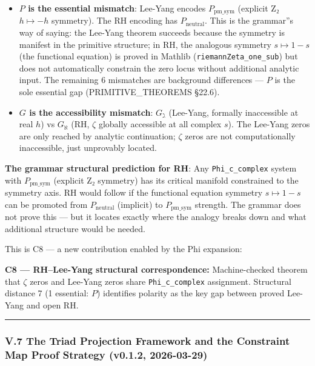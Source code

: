\documentclass[12pt,a4paper]{article}
\newcommand{\pilcrow}{\S}
\begin{document}
\begin{itemize}
    \item \textbf{$P$ is the essential mismatch}: Lee-Yang encodes $P_\text{pm\_sym}$ (explicit Z₂ $h \mapsto -h$ symmetry). The RH encoding has $P_\text{neutral}$. This is the grammar''s way of saying: the Lee-Yang theorem succeeds because the symmetry is manifest in the primitive structure; in RH, the analogous symmetry $s \mapsto 1-s$ (the functional equation) is proved in Mathlib (\texttt{riemannZeta\_one\_sub}) but does not automatically constrain the zero locus without additional analytic input. The remaining 6 mismatches are background differences --- $P$ is the sole essential gap (PRIMITIVE\_THEOREMS \pilcrow{}22.6).
    \item \textbf{$G$ is the accessibility mismatch}: $G_{\gimel}$ (Lee-Yang, formally inaccessible at real $h$) vs $G_{\aleph}$ (RH, $\zeta$ globally accessible at all complex $s$). The Lee-Yang zeros are only reached by analytic continuation; $\zeta$ zeros are not computationally inaccessible, just unprovably located.
\end{itemize}

\textbf{The grammar structural prediction for RH}: Any \texttt{Phi\_c\_complex} system with $P_\text{pm\_sym}$ (explicit Z₂ symmetry) has its critical manifold constrained to the symmetry axis. RH would follow if the functional equation symmetry $s \mapsto 1-s$ can be promoted from $P_\text{neutral}$ (implicit) to $P_\text{pm\_sym}$ strength. The grammar does not prove this --- but it locates exactly where the analogy breaks down and what additional structure would be needed.

This is C8 --- a new contribution enabled by the Phi expansion:

\textbf{C8 --- RH--Lee-Yang structural correspondence:} Machine-checked theorem that $\zeta$ zeros and Lee-Yang zeros share \texttt{Phi\_c\_complex} assignment. Structural distance 7 (1 essential: $P$) identifies polarity as the key gap between proved Lee-Yang and open RH.

\begin{center}
\rule{0.5\textwidth}{0.4pt}
\end{center}

\subsubsection{V.7 The Triad Projection Framework and the Constraint Map Proof Strategy (v0.1.2, 2026-03-29)}
\end{document}
